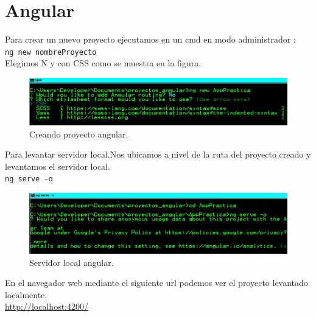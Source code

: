 \chapter{Angular}
Para crear un nuevo proyecto ejecutamos en un cmd en modo administrador :\\
\texttt{ng new nombreProyecto}\\
Elegimos N y  con CSS como se muestra en la figura.\\
\begin{figure}[H] %
	\centering %
	\includegraphics[scale=0.6]{images/c3_1.jpg}
	\caption{Creando proyecto angular.}
\end{figure}
Para levantar servidor local.Nos ubicamos  a nivel de la ruta del proyecto creado y levantamos el servidor local.\\
\texttt{ng serve -o}\\
\begin{figure}[H] %
	\centering %
	\includegraphics[scale=0.6]{images/c3_2.jpg}
	\caption{Servidor local angular.}
\end{figure}
En el navegador web mediante el siguiente url podemos ver el proyecto levantado localmente.\\
\url{http://localhost:4200/}\\


